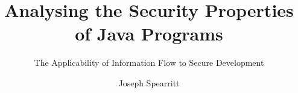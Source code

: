 \usepackage{hyperref}
\usepackage[english]{babel}


\title[Thesis Progress Seminar]
{%
	Analysing the Security Properties\\of Java Programs		
}
\subtitle{The Applicability of Information Flow to Secure Development}
\author{Joseph Spearritt}
